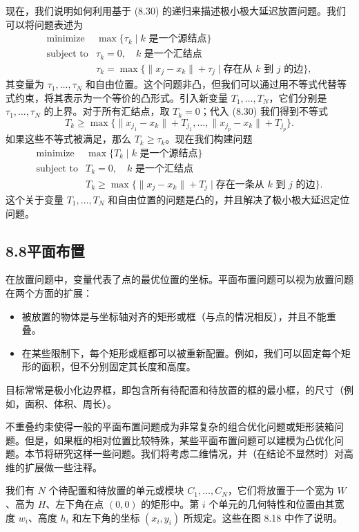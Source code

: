 \documentclass[UTF8,12pt,a4paper,fontset=fandol]{ctexart}
\begin{document}
现在，我们说明如何利用基于 (8.30) 的递归来描述极小极大延迟放置问题。我们可以将问题表述为
\[
\begin{array}{ll}
\mbox{minimize} & \max\{\tau_k\mid k\mbox{ 是一个源结点}\}\\
\mbox{subject to} & \tau_k=0,\quad k\mbox{ 是一个汇结点}\\
& \tau_k=\max\{\|x_j-x_k\|+\tau_j\mid \mbox{存在从 }k\mbox{ 到 }j\mbox{ 的边}\},
\end{array}
\]
其变量为 $\tau_1,\ldots,\tau_N$ 和自由位置。这个问题非凸，但我们可以通过用不等式代替等式约束，将其表示为一个等价的凸形式。引入新变量 $T_1,\ldots,T_N$，它们分别是 $\tau_1,\ldots,\tau_N$ 的上界。对于所有汇结点，取 $T_k=0$；代入 (8.30) 我们得到不等式
\[
T_k\geq \max\{\|x_{j_1}-x_k\|+T_{j_1},\ldots,\|x_{j_p}-x_k\|+T_{j_p}\}.
\]
如果这些不等式被满足，那么 $T_k\geq \tau_k$。现在我们构建问题
\[
\begin{array}{ll}
\mbox{minimize} & \max\{T_k\mid k\mbox{ 是一个源结点}\}\\
\mbox{subject to} & T_k=0,\quad k\mbox{ 是一个汇结点}\\
& T_k\geq \max\{\|x_j-x_k\|+T_j\mid \mbox{存在一条从 }k\mbox{ 到 }j\mbox{ 的边}\}.
\end{array}
\]
这个关于变量 $T_1,\ldots,T_N$ 和自由位置的问题是凸的，并且解决了极小极大延迟定位问题。

\subsection*{8.8\quad 平面布置}

在放置问题中，变量代表了点的最优位置的坐标。平面布置问题可以视为放置问题在两个方面的扩展：

\begin{itemize}
\item 被放置的物体是与坐标轴对齐的矩形或框（与点的情况相反），并且不能重叠。
\item 在某些限制下，每个矩形或框都可以被重新配置。例如，我们可以固定每个矩形的面积，但不分别固定其长度和高度。
\end{itemize}

目标常常是极小化边界框，即包含所有待配置和待放置的框的最小框，的尺寸（例如，面积、体积、周长）。

不重叠约束使得一般的平面布置问题成为非常复杂的组合优化问题或矩形装箱问题。但是，如果框的相对位置比较特殊，某些平面布置问题可以建模为凸优化问题。本节将研究这样一些问题。我们将考虑二维情况，并（在结论不显然时）对高维的扩展做一些注释。

我们有 $N$ 个待配置和待放置的单元或模块 $C_1,\ldots,C_N$，它们将放置于一个宽为 $W$、高为 $H$、左下角在点 $(0,0)$ 的矩形中。第 $i$ 个单元的几何特性和位置由其宽度 $w_i$、高度 $h_i$ 和左下角的坐标 $(x_i,y_i)$ 所规定。这些在图 8.18 中作了说明。
\end{document}
